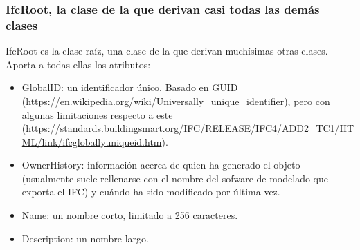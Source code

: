\documentclass[spanish,10pt,a4paper,final,oneside]{article}
\begin{document}
\subsubsection{IfcRoot, la clase de la que derivan casi todas las demás clases}
IfcRoot es la clase raíz, una clase de la que derivan muchísimas otras clases. Aporta a todas ellas los atributos:
\begin{itemize}
\item GlobalID: un identificador único. Basado en GUID (\url{https://en.wikipedia.org/wiki/Universally_unique_identifier}), pero con algunas limitaciones respecto a este (\url{https://standards.buildingsmart.org/IFC/RELEASE/IFC4/ADD2_TC1/HTML/link/ifcgloballyuniqueid.htm}).
\item OwnerHistory: información acerca de quien ha generado el objeto (usualmente suele rellenarse con el nombre del sofware de modelado que exporta el IFC) y cuándo ha sido modificado por última vez. 
\item Name: un nombre corto, limitado a 256 caracteres.
\item Description: un nombre largo.
\end{itemize}
\end{document}
